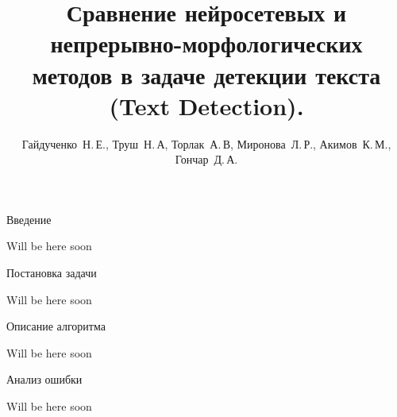 \documentclass[12pt,twoside]{article}
\title
    [Обнаружение текста]
    {\textbf{Сравнение нейросетевых и непрерывно-морфологических методов в задаче детекции текста (Text Detection).}}
\author
    {Гайдученко~Н.\,Е., Труш~Н.\,А, Торлак~А.\,В, Миронова~Л.\,Р., Акимов~К.\,М., Гончар~Д.\,А.}
\begin{document}
\maketitle
\bigskip

Введение

Will be here soon

Постановка задачи

Will be here soon

Описание алгоритма

Will be here soon

Анализ ошибки

Will be here soon

\bigskip
\bigskip
\bigskip
\end{document}
